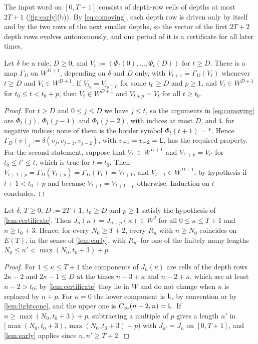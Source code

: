 The input word on $[0,T+1]$ consists of depth-row cells of depths at most
$2T+1$ (\cref{fig:early}(b)). By \eqref{eq:comoving}, each depth row is driven
only by itself and by the two rows of the next smaller depths, so the vector of
the first $2T+2$ depth rows evolves autonomously, and one period of it is a
certificate for all later times.

\begin{lemma}\label{lem:certificate}
Let $\delta$ be a rule, $D\ge0$, and $V_t:=(\Phi_t(0),\dots,\Phi_t(D))$ for
$t\ge D$. There is a map $\Gamma_D$ on $W^{D+1}$, depending on $\delta$ and $D$
only, with $V_{t+1}=\Gamma_D(V_t)$ whenever $t\ge D$ and $V_t\in W^{D+1}$. If
$V_{t_0}=V_{t_0+p}$ for some $t_0\ge D$ and $p\ge1$, and $V_t\in W^{D+1}$ for
$t_0\le t<t_0+p$, then $V_t\in W^{D+1}$ and $V_{t+p}=V_t$ for all $t\ge t_0$.
\end{lemma}

\begin{proof}
For $t\ge D$ and $0\le j\le D$ we have $j\le t$, so the arguments in
\eqref{eq:comoving} are $\Phi_t(j)$, $\Phi_t(j-1)$ and $\Phi_t(j-2)$, with
indices at most $D$, and $\mathsf L$ for negative indices; none of them is the border
symbol $\Phi_t(t+1)=\ast$. Hence $\Gamma_D(v)_j:=\delta(v_j,v_{j-1},v_{j-2})$, with
$v_{-1}=v_{-2}=\mathsf L$, has the required property. For the second statement,
suppose that $V_{t'}\in W^{D+1}$ and $V_{t'+p}=V_{t'}$ for $t_0\le t'\le t$,
which is true for $t=t_0$. Then $V_{t+1+p}=\Gamma_D(V_{t+p})=\Gamma_D(V_t)=V_{t+1}$, and
$V_{t+1}\in W^{D+1}$, by hypothesis if $t+1<t_0+p$ and because
$V_{t+1}=V_{t+1-p}$ otherwise. Induction on $t$ concludes.
\end{proof}

\begin{corollary}\label{cor:reduce}
Let $\delta$, $T\ge0$, $D:=2T+1$, $t_0\ge D$ and $p\ge1$ satisfy the hypothesis
of \cref{lem:certificate}. Then $J_n(\kappa)=J_{n+p}(\kappa)\in W^2$ for all
$0\le\kappa\le T+1$ and $n\ge t_0+3$. Hence, for every $N_0\ge T+2$, every
$R_n$ with $n\ge N_0$ coincides on $E(T)$, in the sense of \cref{lem:early},
with $R_{n'}$ for one of the finitely many lengths $N_0\le
n'<\max(N_0,t_0+3)+p$.
\end{corollary}

\begin{proof}
For $1\le\kappa\le T+1$ the components of $J_n(\kappa)$ are cells of the depth
rows $2\kappa-2$ and $2\kappa-1\le D$ at the times $n-3+\kappa$ and
$n-2+\kappa$, which are at least $n-2>t_0$; by \cref{lem:certificate} they lie
in $W$ and do not change when $n$ is replaced by $n+p$. For $\kappa=0$ the
lower component is $\mathsf L$, by convention or by \cref{lem:lightcone}, and the
upper one is $C_\infty(n-2,n)=\mathsf L$. If $n\ge\max(N_0,t_0+3)+p$, subtracting a
multiple of $p$ gives a length $n'$ in $[\max(N_0,t_0+3),\max(N_0,t_0+3)+p)$
with $J_{n'}=J_n$ on $[0,T+1]$, and \cref{lem:early} applies since
$n,n'\ge T+2$.
\end{proof}

